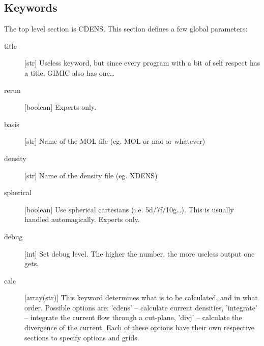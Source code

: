 \documentclass[a4paper,11pt]{article}
\begin{document}
\subsection{Keywords}
The top level section is CDENS. This section defines a few global parameters:
\begin{description}
  \item[title] [str] Useless keyword, but since every program with a bit of self
	respect has a title, GIMIC also has one\ldots
  \item[rerun] [boolean] Experts only.
  \item[basis] [str] Name of the MOL file (eg. MOL or mol or whatever)	
  \item[density] [str] Name of the density file (eg. XDENS)	
  \item[spherical] [boolean] Use spherical cartesians (i.e. 5d/7f/10g\ldots).
	This is usually handled automagically. Experts only.
  \item[debug] [int] Set debug level. The higher the number, the more useless
	output one gets.
  \item[calc] [array(str)] This keyword determines what is to be calculated, and
	in what order. Possible options are: 'cdens' -- calculate current densities,
	'integrate' -- integrate the current flow through a cut-plane, 'divj' --
	calculate the divergence of the current. Each of these options have their
	own respective sections to specify options and grids.
\end{description}
\end{document}
